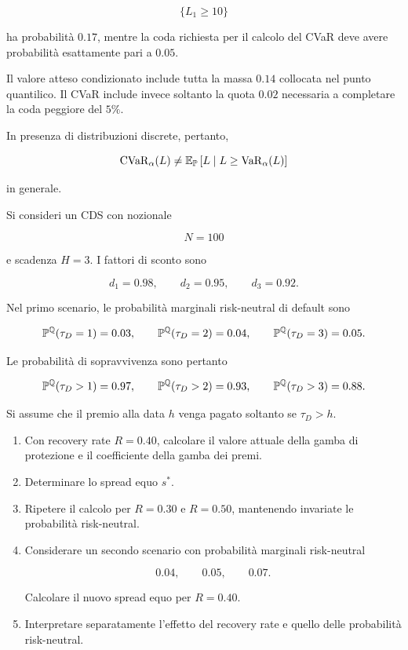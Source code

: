 \begin{enumerate}
\[
\{L_1\geq10\}
\]

ha probabilit\`{a} $0.17$, mentre la coda richiesta per il calcolo del
CVaR deve avere probabilit\`{a} esattamente pari a $0.05$.

Il valore atteso condizionato include tutta la massa $0.14$ collocata
nel punto quantilico. Il CVaR include invece soltanto la quota $0.02$
necessaria a completare la coda peggiore del $5\%$.

In presenza di distribuzioni discrete, pertanto,

\[
\operatorname{CVaR}_{\alpha}(L)
\neq
\mathbb{E}_{\mathbb{P}}
\left[
L
\mid
L\geq\operatorname{VaR}_{\alpha}(L)
\right]
\]

in generale.

\end{enumerate}

\begin{exercise}

\label{ex:cap09-sensibilita-spread-cds}

Si consideri un CDS con nozionale

\[
N=100
\]

e scadenza $H=3$. I fattori di sconto sono

\[
d_1=0.98,
\qquad
d_2=0.95,
\qquad
d_3=0.92.
\]

Nel primo scenario, le probabilit\`{a} marginali risk-neutral di
default sono

\[
\mathbb{P}^{\mathbb{Q}}(\tau_D=1)=0.03,
\qquad
\mathbb{P}^{\mathbb{Q}}(\tau_D=2)=0.04,
\qquad
\mathbb{P}^{\mathbb{Q}}(\tau_D=3)=0.05.
\]

Le probabilit\`{a} di sopravvivenza sono pertanto

\[
\mathbb{P}^{\mathbb{Q}}(\tau_D>1)=0.97,
\qquad
\mathbb{P}^{\mathbb{Q}}(\tau_D>2)=0.93,
\qquad
\mathbb{P}^{\mathbb{Q}}(\tau_D>3)=0.88.
\]

Si assume che il premio alla data $h$ venga pagato soltanto se
$\tau_D>h$.

\begin{enumerate}

\item Con recovery rate $R=0.40$, calcolare il valore attuale della
gamba di protezione e il coefficiente della gamba dei premi.

\item Determinare lo spread equo $s^*$.

\item Ripetere il calcolo per $R=0.30$ e $R=0.50$, mantenendo
invariate le probabilit\`{a} risk-neutral.

\item Considerare un secondo scenario con probabilit\`{a} marginali
risk-neutral

\[
0.04,
\qquad
0.05,
\qquad
0.07.
\]

Calcolare il nuovo spread equo per $R=0.40$.

\item Interpretare separatamente l'effetto del recovery rate e quello
delle probabilit\`{a} risk-neutral.
\end{enumerate}
\end{exercise}

